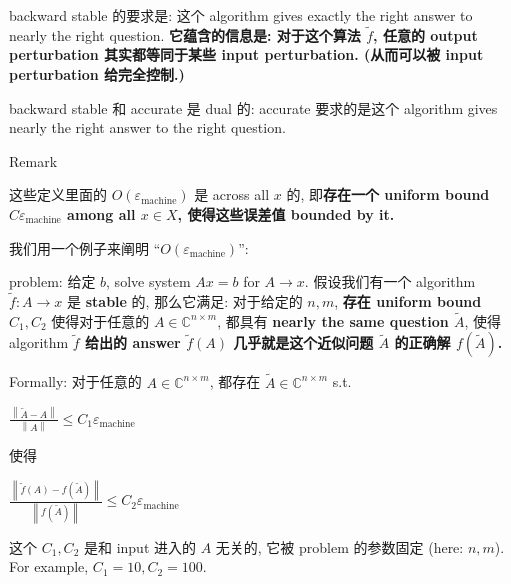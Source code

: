 backward stable 的要求是: 这个 algorithm gives exactly the right answer to nearly the right question. \textbf{它蕴含的信息是: 对于这个算法 \(\widetilde{f}\), 任意的 output perturbation 其实都等同于某些 input perturbation. (从而可以被 input perturbation 给完全控制.)}

backward stable 和 accurate 是 dual 的: accurate 要求的是这个 algorithm gives nearly the right answer to the right question.

\begin{qlremark}{Remark}

这些定义里面的 \(O\left( \varepsilon_{\text{machine}} \right)\) 是 across all \(x\) 的, 即\textbf{存在一个 uniform bound \(C\varepsilon_{\text{machine}}\) among all \(x \in X\), 使得这些误差值 bounded by it.}

\end{qlremark}

\begin{example}

我们用一个例子来阐明 ``\(O\left( \varepsilon_{\text{machine}} \right)\)'':

problem: 给定 \(b\), solve system \(Ax = b\) for \(A\rightarrow x\). 假设我们有一个 algorithm \(\widetilde{f}:A\rightarrow x\) 是 \textbf{stable} 的, 那么它满足: 对于给定的 \(n,m\), \textbf{存在 uniform bound \(C_{1},C_{2}\)} 使得对于任意的 \(A \in \mathbb{C}^{n \times m}\), 都具有 \textbf{nearly the same question \(\widetilde{A}\)}, 使得 algorithm \textbf{\(\widetilde{f}\) 给出的 answer \(\widetilde{f}(A)\) 几乎就是这个近似问题 \(\widetilde{A}\) 的正确解 \(f\left( \widetilde{A} \right)\).}

Formally: 对于任意的 \(A \in \mathbb{C}^{n \times m}\), 都存在 \(\widetilde{A} \in \mathbb{C}^{n \times m}\) s.t.

\(\frac{\left\| {\widetilde{A} - A} \right\|}{\left\| A \right\|} \leq C_{1}\varepsilon_{\text{machine}}\)

使得

\(\frac{\left\| {\widetilde{f}(A) - f\left( \widetilde{A} \right)} \right\|}{\left\| {f\left( \widetilde{A} \right)} \right\|} \leq C_{2}\varepsilon_{\text{machine}}\)

这个 \(C_{1},C_{2}\) 是和 input 进入的 \(A\) 无关的, 它被 problem 的参数固定 (here: \(n,m\)). For example, \(C_{1} = 10,C_{2} = 100\).

\end{example}

